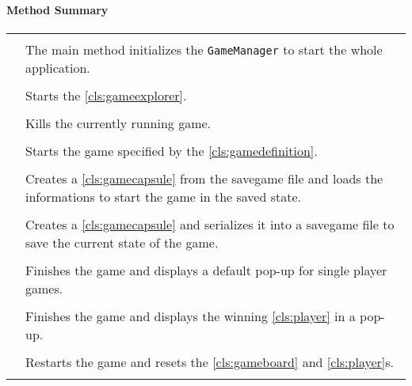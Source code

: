 \centerdash

\paragraph*{Method Summary}
\paragraph*{}
\begin{longtable}{Lp{10cm}}
	\startmethodtable
	 \\
	& The main method initializes the \texttt{GameManager} to start the whole application. \\
	 \\
	& Starts the \ref{cls:gameexplorer}. \\
	 \\
	& Kills the currently running game. \\
	 \\
	& Starts the game specified by the \ref{cls:gamedefinition}. \\
	 \\
	& Creates a \ref{cls:gamecapsule} from the savegame file and loads the informations to start the game in the saved state. \\
	 \\
	& Creates a \ref{cls:gamecapsule} and serializes it into a savegame file to save the current state of the game. \\
	 \\
	& Finishes the game and displays a default pop-up for single player games. \\
	 \\
	& Finishes the game and displays the winning \ref{cls:player} in a pop-up.  \\
	 \\
	& Restarts the game and resets the \ref{cls:gameboard} and \ref{cls:player}s. \\
	 \\

\end{longtable}
